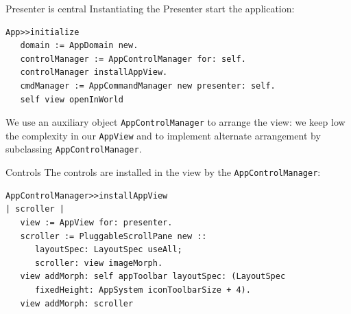 \documentclass{beamer}
\begin{document}
\begin{frame}[fragile]{Presenter is central}
    \fontsize{10pt}{8pt}\selectfont
Instantiating the Presenter start the application:
\begin{lstlisting}[language=Smalltalk]
App>>initialize
   domain := AppDomain new.
   controlManager := AppControlManager for: self.
   controlManager installAppView.
   cmdManager := AppCommandManager new presenter: self.
   self view openInWorld 
 \end{lstlisting}
 We use an auxiliary object \texttt{AppControlManager} to arrange the
 view: we keep low the complexity in our \texttt{AppView} and to
 implement alternate arrangement by subclassing
 \texttt{AppControlManager}.
\end{frame}

\begin{frame}[fragile]{Controls}
  \fontsize{10pt}{8pt}\selectfont
  The controls are installed in the view by the
  \texttt{AppControlManager}:
  \begin{lstlisting}[language=Smalltalk]
AppControlManager>>installAppView
| scroller |
   view := AppView for: presenter.
   scroller := PluggableScrollPane new :: 
      layoutSpec: LayoutSpec useAll;
      scroller: view imageMorph.	
   view addMorph: self appToolbar layoutSpec: (LayoutSpec
      fixedHeight: AppSystem iconToolbarSize + 4).
   view addMorph: scroller    
  \end{lstlisting} 
\end{frame}
\end{document}
